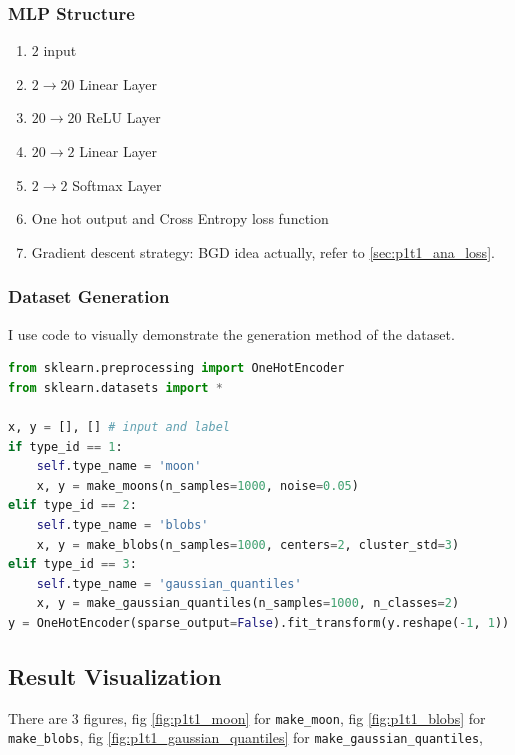 \documentclass{article}
\begin{document}
\subsubsection{MLP Structure}

\begin{enumerate}
    \item $2$ input
    \item $2 \to 20$ Linear Layer
    \item $20 \to 20$ ReLU Layer
    \item $20 \to 2$ Linear Layer
    \item $2 \to 2$ Softmax Layer
    \item One hot output and Cross Entropy loss function
    \item Gradient descent strategy: BGD idea actually, refer to \ref{sec:p1t1_ana_loss}.
\end{enumerate}

\subsubsection{Dataset Generation}

I use code to visually demonstrate the generation method of the dataset.

\begin{lstlisting}[language=Python]
from sklearn.preprocessing import OneHotEncoder
from sklearn.datasets import *

x, y = [], [] # input and label
if type_id == 1:
    self.type_name = 'moon'
    x, y = make_moons(n_samples=1000, noise=0.05)
elif type_id == 2:
    self.type_name = 'blobs'
    x, y = make_blobs(n_samples=1000, centers=2, cluster_std=3)
elif type_id == 3:
    self.type_name = 'gaussian_quantiles'
    x, y = make_gaussian_quantiles(n_samples=1000, n_classes=2)
y = OneHotEncoder(sparse_output=False).fit_transform(y.reshape(-1, 1))
\end{lstlisting}

\subsection{Result Visualization}

There are 3 figures, fig \ref{fig:p1t1_moon} for \texttt{make\_moon}, fig \ref{fig:p1t1_blobs} for \texttt{make\_blobs}, fig \ref{fig:p1t1_gaussian_quantiles} for \texttt{make\_gaussian\_quantiles},
\end{document}
